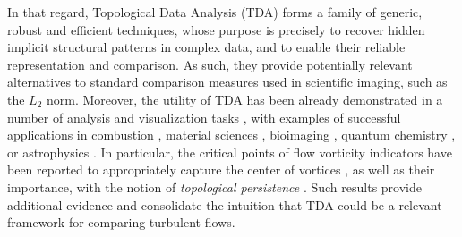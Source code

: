 In that regard, Topological Data Analysis (TDA) \cite{edelsbrunner09} forms a
family of generic, robust and efficient techniques, whose purpose is precisely
to recover hidden implicit structural patterns in complex data, and to enable
their reliable representation and comparison. As such, they provide
potentially relevant alternatives to standard comparison measures used in
scientific imaging, such as the $L_2$ norm. Moreover, the utility of TDA has
been already demonstrated in a number of analysis and visualization tasks
\cite{heine16}, with examples of successful applications in
combustion \cite{laney_vis06, bremer_tvcg11, gyulassy_ev14},
material sciences \cite{gyulassy_vis07, gyulassy_vis15, favelier16},
bioimaging \cite{carr04, topoAngler, beiBrain18},
quantum chemistry \cite{chemistry_vis14, harshChemistry, Malgorzata19}, or
astrophysics \cite{sousbie11, shivashankar2016felix}. In
particular, the critical points of flow vorticity indicators have been
reported to appropriately capture the center of vortices \cite{kasten_tvcg11,
bridel_ldav19}, as well as their importance, with the notion of
\emph{topological persistence} \cite{edelsbrunner02}. Such  results provide
additional evidence and consolidate the intuition that TDA could be a
relevant framework for comparing turbulent flows.

